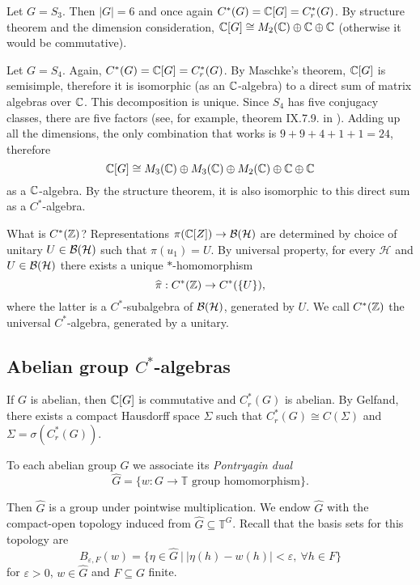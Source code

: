 \begin{example}
  Let $G = S_3$. Then $|G| = 6$ and once again $C^* (G) = \mathbb {C} [G] = C_r ^* (G)$.
  By structure theorem and the dimension consideration, $\mathbb {C} [G] \cong M_2 (\mathbb {C}) \oplus \mathbb {C} \oplus \mathbb {C}$ (otherwise it would be commutative).
\end{example}

\begin{example}
  Let $G = S_4$. Again, $C^* (G) = \mathbb {C} [G] = C_r ^* (G)$. By Maschke's theorem, $\mathbb {C} [G]$ is semisimple, therefore it is isomorphic (as an $\mathbb {C}$-algebra) to a direct sum of matrix algebras over $\mathbb {C}$.
  This decomposition is unique.
  Since $S_4$ has five conjugacy classes, there are five factors
  (see, for example, theorem IX.7.9. in \cite{grillet}).
  Adding up all the dimensions, the only combination that works is $9 + 9 + 4 + 1 + 1 = 24$, therefore 
  $$\mathbb {C} [G] \cong M_3 (\mathbb {C}) \oplus M_3 (\mathbb {C}) \oplus M_2 (\mathbb {C}) \oplus \mathbb {C} \oplus \mathbb {C}$$
  as a $\mathbb {C}$-algebra. By the structure theorem, it is also isomorphic to this direct sum as a $C^*$-algebra.
\end{example}

\begin{example}
  What is $C^* (\mathbb {Z})$? Representations $\pi(\mathbb {C} [Z]) \to \operatorname{\mathcal{B} (\mathcal{H})}$ are determined by choice of unitary $U \in \operatorname{\mathcal{B} (\mathcal{H})}$ such that $\pi (u_1) = U$.
  By universal property, for every $\mathcal{H}$ and $U \in \operatorname{\mathcal{B} (\mathcal{H})}$ there exists a unique $*$-homomorphism 
  $$\widehat{\pi}: C^* (\mathbb {Z}) \to C^* (\{U\}),$$ where the latter is a $C^*$-subalgebra of $\operatorname{\mathcal{B} (\mathcal{H})}$, generated by $U$. 
  We call $C^* (\mathbb {Z})$ the universal $C^*$-algebra, generated by a unitary.
\end{example}

\subsection{Abelian group $C^*$-algebras}

If $G$ is abelian, then $\mathbb {C} [G]$ is commutative and $C_r ^* (G)$ is abelian.
By Gelfand, there exists a compact Hausdorff space $\Sigma$ such that $C_r ^* (G) \cong C(\Sigma)$
and $\Sigma = \sigma(C_r ^* (G))$.

\begin{definition}
  To each abelian group $G$ we associate its \emph{Pontryagin dual} 
  $$\widehat{G} = \{\textrm{$w: G \to \mathbb{T}$ group homomorphism}\}.$$
\end{definition}

Then $\widehat{G}$ is a group under pointwise multiplication. We endow $\widehat{G}$
with the compact-open topology induced from $\widehat{G} \subseteq \mathbb{T} ^G$.
Recall that the basis sets for this topology are 
$$B_{\varepsilon, F} (w) = \{\eta \in \widehat{G}\ |\ |\eta (h) - w(h)| < \varepsilon,\ \forall h \in F\}$$
for $\varepsilon > 0$, $w \in \widehat{G}$ and $F \subseteq G$ finite.

